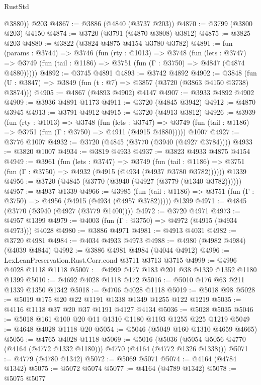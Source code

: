 \begin{lexlean}{RustStd}
\begin{coremodule}
        @3880))
    @203
@4867 := @3886 (@4840 (@3737 @203))
@4870 := @3799 (@3800 @203) @4150
@4874 := @3720 (@3791 (@4870 @3808) @3812)
@4875 := @3825 @203
@4880 := @3822 (@3824 @4875 @4154 @3780 @3782)
@4891 := fun (params : @3744) =>
  @3746
    (fun (rty : @1013) =>
    @3748
      (fun (lets : @3747) =>
      @3749 (fun (tail : @1186) => @3751 (fun (Γ : @3750) => @4847 (@4874 @4880)))))
@4892 := @3745 @4891
@4893 := @3742 @4892
@4902 := @3848 (fun (U : @3847) => @3849 (fun (t : @7) => @3857 (@3720 (@3863 @4150 @3738) @3874)))
@4905 := @4867 (@4893 @4902) @4147
@4907 := @3933 @4892 @4902
@4909 := @3936 @4891 @1173
@4911 := @3720 (@4845 @3942)
@4912 := @4870 @3945
@4913 := @3791 @4912
@4915 := @3720 (@4913 @3812)
@4926 := @3939
    (fun (rty : @1013) =>
    @3748
      (fun (lets : @3747) =>
      @3749 (fun (tail : @1186) => @3751 (fun (Γ : @3750) => @4911 (@4915 @4880)))))
    @1007
@4927 := @3776 @1007
@4932 := @3720 (@4845 (@3770 (@3940 (@4927 @3784))))
@4933 := @3820 @1007
@4934 := @3819 @4933
@4937 := @3823 @4933 @4875 @4154
@4949 := @3961
    (fun (lets : @3747) =>
    @3749
      (fun (tail : @1186) => @3751 (fun (Γ : @3750) => @4932 (@4915 (@4934 (@4937 @3780 @3782))))))
    @1339
@4956 := @3720 (@4845 (@3770 (@3940 (@4927 (@3779 (@1340 @3782))))))
@4957 := @4937 @1339
@4966 := @3985
    (fun (tail : @1186) => @3751 (fun (Γ : @3750) => @4956 (@4915 (@4934 (@4957 @3782)))))
    @1399
@4971 := @4845 (@3770 (@3940 (@4927 (@3779 @1400))))
@4972 := @3720 @4971
@4973 := @4957 @1399
@4979 := @4003 (fun (Γ : @3750) => @4972 (@4915 (@4934 @4973))) @4028
@4980 := @3886 @4971
@4981 := @4913 @4031
@4982 := @3720 @4981
@4984 := @4034 @4933 @4973
@4988 := @4980 (@4982 @4984) (@4039 @4844)
@4992 := @3886 @4981 @4984 (@4044 @4912)
@4996 := LexLeanPreservation.Rust.Corr.cond @3711 @3713 @3715
@4999 := @4996 @4028 @1118 @1118
@5007 := @4999 @177 @183 @201 @38 @1339 @1352 @1180 @1399
@5010 := @4692 @4028 @1118 @172
@5016 := @5010 @176 @63 @211 @1339 @1350 @1342
@5018 := @4706 @4028 @1118
@5019 := @5018 @98
@5028 := @5019 @175 @20 @22 @1191 @1338 @1349 @1255 @122 @1219
@5035 := @4116 @1118 @37 @20 @37 @1191 @4127 @4134
@5036 := @5028 @5035
@5046 := @5018 @161 @100 @20 @11 @1310 @1180 @1193 @1255 @225 @1219
@5049 := @4648 @4028 @1118 @20
@5054 := @5046 (@5049 @160 @1310 @4659 @4665)
@5056 := @4765 @4028 @1118
@5069 := @5016
    (@5036 (@5054 @5056 @4770 (@4164 (@4772 @1332 @1180))) @4770 (@4164 (@4772 @1326 @1338)))
@5071 := @4779 (@4780 @1342)
@5072 := @5069 @5071
@5074 := @4164 (@4784 @1342)
@5075 := @5072 @5074
@5077 := @4164 (@4789 @1342)
@5078 := @5075 @5077

\end{coremodule}
\end{lexlean}
